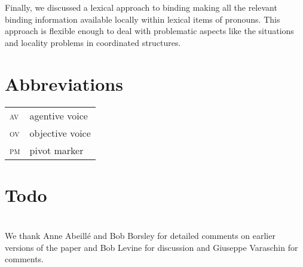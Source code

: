 \documentclass[output=paper
 	        ,biblatex
                ,babelshorthands
                ,newtxmath
                ,draftmode
                ,colorlinks, citecolor=brown
]{langscibook}
\begin{document}
Finally, we discussed a lexical approach to binding making all the relevant binding information
available locally within lexical items of pronouns. This approach is flexible enough to deal with
problematic aspects like the \iwithini situations and locality problems in coordinated structures.

\section*{Abbreviations}

\begin{tabularx}{.99\textwidth}{@{}lX}
\textsc{av} & agentive voice\\
\textsc{ov} & objective voice\\
\textsc{pm} & pivot marker\\
\end{tabularx}

\section{Todo}



\section*{\acknowledgmentsUS}


We thank Anne Abeillé and Bob Borsley for detailed comments on earlier versions of the paper and Bob Levine for discussion and Giuseppe Varaschin for comments.








{\sloppy
\printbibliography[heading=subbibliography,notkeyword=this]
}
\end{document}
